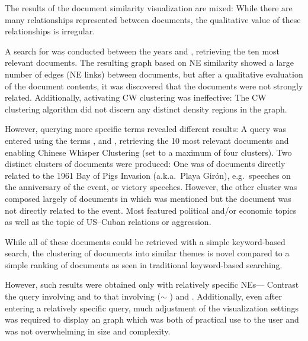 The results of the document similarity visualization are mixed: While there are many relationships represented between documents, the qualitative value of these relationships is irregular.

A search for  was conducted between the years  and , retrieving the ten most relevant documents. The resulting graph based on NE similarity showed a large number of 
edges (NE links) between documents, but after a qualitative evaluation of the document contents, it was discovered that the documents were not strongly related. Additionally, activating CW clustering was ineffective: The CW clustering algorithm did not discern any distinct density regions in the graph.

However, querying more specific terms revealed different results: A query was entered using the terms , and , retrieving the 10 most relevant documents and enabling Chinese Whisper Clustering (set to a maximum of four clusters). Two distinct clusters of documents were produced: One was of documents directly related to the 1961 Bay of Pigs Invasion (a.k.a.\ Playa Gir\'{o}n), e.g.\ speeches on the anniversary of the event, or victory speeches. However, the other cluster was composed largely of documents in which  was mentioned but the document was not directly related to the event. Most featured political and/or economic topics as well as the topic of US--Cuban relations or aggression.

While all of these documents could be retrieved with a simple keyword-based search, the clustering of documents into similar themes is novel compared to a simple ranking of documents as seen in traditional keyword-based searching.

However, such results were obtained only with relatively specific NEs--- Contrast the query involving  and  to that involving  ($\sim$ )  and . Additionally, even after entering a relatively specific query, much adjustment of the visualization settings was required to display an graph which was both of practical use to the user and was not overwhelming in size and complexity.